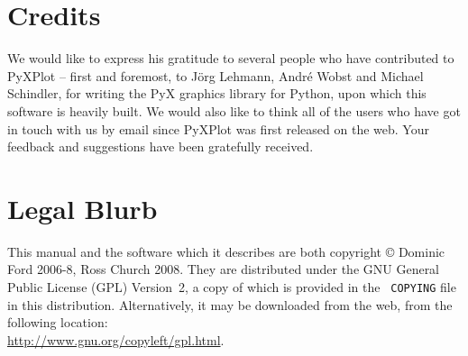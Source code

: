 \section{Credits}

We would like to express his gratitude to several people who have contributed
to PyXPlot -- first and foremost, to J\"org Lehmann, Andr\'e Wobst and Michael
Schindler, for writing the PyX graphics library for Python, upon which this
software is heavily built. We would also like to think all of the users who
have got in touch with us by email since PyXPlot was first released on the web.
Your feedback and suggestions have been gratefully received.

\section{Legal Blurb}

This manual and the software which it describes are both copyright \copyright
Dominic Ford 2006-8, Ross Church 2008. They are distributed under the GNU
General Public License (GPL) Version~2, a copy of which is provided in the {\tt
COPYING} file in this distribution.
Alternatively, it may be downloaded from the web, from the following
location:\\ \url{http://www.gnu.org/copyleft/gpl.html}.

